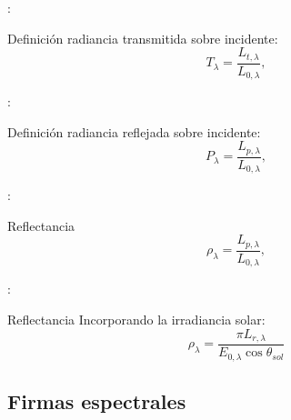 \begin{frame}{\secname : \subsecname}
    \begin{block}{Definición}
       radiancia transmitida sobre incidente:
        \begin{equation}
         T_\lambda = \frac{L_{t,\lambda}}{L_{0,\lambda}} ,
        \end{equation}
         \end{block}
\end{frame}



\begin{frame}{\secname : \subsecname}
    \begin{block}{Definición}
       radiancia reflejada sobre incidente:
        \begin{equation}
         P_\lambda = \frac{L_{p,\lambda}}{L_{0,\lambda}} ,
        \end{equation}
         \end{block}
\end{frame}









\begin{frame}{\secname : \subsecname}
    \begin{block}{Reflectancia}
               \begin{equation}
         \rho_\lambda = \frac{L_{p,\lambda}}{L_{0,\lambda}} ,
        \end{equation}
         \end{block}
\end{frame}


\begin{frame}{\secname : \subsecname}
    \begin{block}{Reflectancia}
        Incorporando la irradiancia solar:
        \begin{equation}
          \rho_\lambda = \frac{\pi L_{r,\lambda}}{E_{0,\lambda} \cos \theta_{sol}}
        \end{equation}
    \end{block}
\end{frame}

\subsection{Firmas espectrales}


